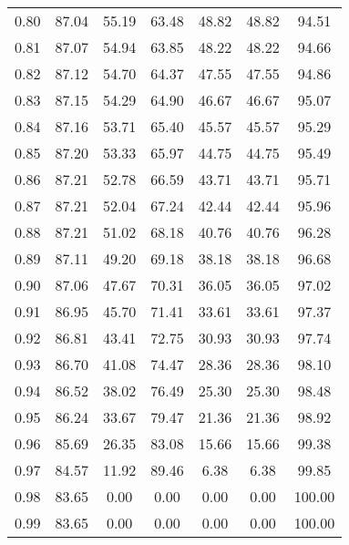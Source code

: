\begin{tabular}{|c|c|c|c|c|c|c|}
      0.80 &     87.04 &     55.19 &      63.48 &   48.82 &      48.82 &         94.51 \\
      0.81 &     87.07 &     54.94 &      63.85 &   48.22 &      48.22 &         94.66 \\
      0.82 &     87.12 &     54.70 &      64.37 &   47.55 &      47.55 &         94.86 \\
      0.83 &     87.15 &     54.29 &      64.90 &   46.67 &      46.67 &         95.07 \\
      0.84 &     87.16 &     53.71 &      65.40 &   45.57 &      45.57 &         95.29 \\
      0.85 &     87.20 &     53.33 &      65.97 &   44.75 &      44.75 &         95.49 \\
      0.86 &     87.21 &     52.78 &      66.59 &   43.71 &      43.71 &         95.71 \\
      0.87 &     87.21 &     52.04 &      67.24 &   42.44 &      42.44 &         95.96 \\
      0.88 &     87.21 &     51.02 &      68.18 &   40.76 &      40.76 &         96.28 \\
      0.89 &     87.11 &     49.20 &      69.18 &   38.18 &      38.18 &         96.68 \\
      0.90 &     87.06 &     47.67 &      70.31 &   36.05 &      36.05 &         97.02 \\
      0.91 &     86.95 &     45.70 &      71.41 &   33.61 &      33.61 &         97.37 \\
      0.92 &     86.81 &     43.41 &      72.75 &   30.93 &      30.93 &         97.74 \\
      0.93 &     86.70 &     41.08 &      74.47 &   28.36 &      28.36 &         98.10 \\
      0.94 &     86.52 &     38.02 &      76.49 &   25.30 &      25.30 &         98.48 \\
      0.95 &     86.24 &     33.67 &      79.47 &   21.36 &      21.36 &         98.92 \\
      0.96 &     85.69 &     26.35 &      83.08 &   15.66 &      15.66 &         99.38 \\
      0.97 &     84.57 &     11.92 &      89.46 &    6.38 &       6.38 &         99.85 \\
      0.98 &     83.65 &      0.00 &       0.00 &    0.00 &       0.00 &        100.00 \\
      0.99 &     83.65 &      0.00 &       0.00 &    0.00 &       0.00 &        100.00 \\
\bottomrule
\end{tabular}
